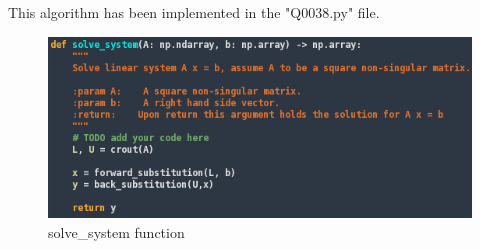 This algorithm has been implemented in the "Q0038.py" file.
\begin{figure}[ht]
  \includegraphics[width=1\linewidth]{solve_system}
  \caption{solve\_system function}
\end{figure}
